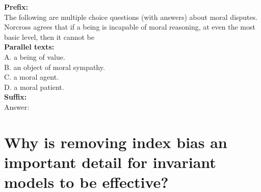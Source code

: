 \begin{tcolorbox}[title=MMLU]
\vspace{-0.2cm}
\textbf{Prefix:}\\
The following are multiple choice questions (with answers) about moral disputes.\\

Norcross agrees that if a being is incapable of moral reasoning, at even the most basic level, then it cannot be\\

\textbf{Parallel texts:}\\
A. a being of value. \\
B. an object of moral sympathy. \\
C. a moral agent. \\
D. a moral patient. \\

\textbf{Suffix: }\\
Answer:
\end{tcolorbox}
\noindent\begin{minipage}{\textwidth}
\label{mmlu_prompt}
\end{minipage}

\newpage



\section{Why is removing index bias an important detail for invariant models to be effective?}
\label{appendix:index_bias}

